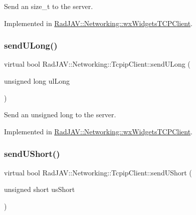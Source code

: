Send an size\+\_\+t to the server. 



Implemented in \mbox{\hyperlink{class_rad_j_a_v_1_1_networking_1_1wx_widgets_t_c_p_client_a548db141df3e65127f8a96dbfe63cea1}{Rad\+J\+A\+V\+::\+Networking\+::wx\+Widgets\+T\+C\+P\+Client}}.

\mbox{\label{class_rad_j_a_v_1_1_networking_1_1_tcpip_client_a0d74f790e410fbecba34e53d4d47ad9f}} 
\subsubsection{\texorpdfstring{send\+U\+Long()}{sendULong()}}
{\footnotesize\ttfamily virtual bool Rad\+J\+A\+V\+::\+Networking\+::\+Tcpip\+Client\+::send\+U\+Long (\begin{DoxyParamCaption}\item[{unsigned long}]{ul\+Long }\end{DoxyParamCaption})\hspace{0.3cm}{\ttfamily [pure virtual]}}



Send an unsigned long to the server. 



Implemented in \mbox{\hyperlink{class_rad_j_a_v_1_1_networking_1_1wx_widgets_t_c_p_client_a8440ad8c4446f1525329cfe40d630ead}{Rad\+J\+A\+V\+::\+Networking\+::wx\+Widgets\+T\+C\+P\+Client}}.

\mbox{\label{class_rad_j_a_v_1_1_networking_1_1_tcpip_client_a47f22ef4c7e7a8b5a938b8f567eee0ee}} 
\subsubsection{\texorpdfstring{send\+U\+Short()}{sendUShort()}}
{\footnotesize\ttfamily virtual bool Rad\+J\+A\+V\+::\+Networking\+::\+Tcpip\+Client\+::send\+U\+Short (\begin{DoxyParamCaption}\item[{unsigned short}]{us\+Short }\end{DoxyParamCaption})\hspace{0.3cm}{\ttfamily [pure virtual]}}



